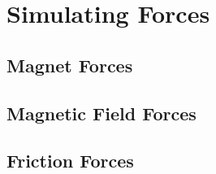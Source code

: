 \section{Simulating Forces}


\subsection{Magnet Forces}
\label{sec:force_magnet}


\subsection{Magnetic Field Forces}
\label{sec:force_field}



\subsection{Friction Forces}
\label{sec:force_friction}



